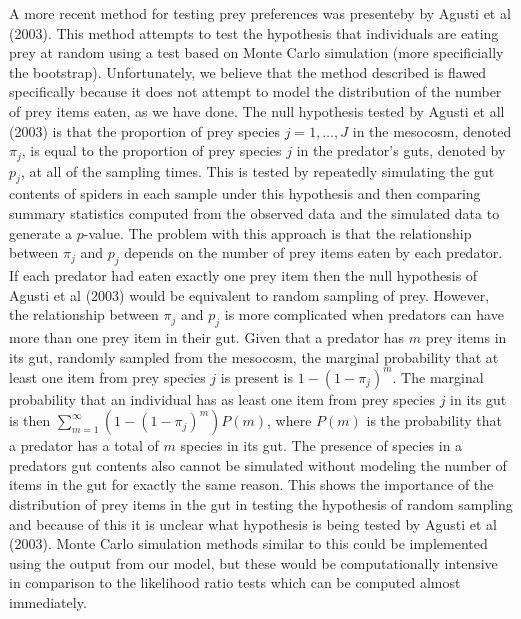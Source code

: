 \documentclass[smallextended]{svjour3}
\begin{document}
A more recent method for testing prey preferences was presenteby by Agusti et al (2003).  This method attempts to test the hypothesis that individuals are eating prey at random using a test based on Monte Carlo simulation (more specificially the bootstrap).  Unfortunately, we believe that the method described is flawed specifically because it does not attempt to model the distribution of the number of prey items eaten, as we have done.  The null hypothesis tested by Agusti et all (2003) is that the proportion of prey species $j=1,\ldots,J$ in the mesocosm, denoted $\pi_j$, is equal to the proportion of prey species $j$ in the predator's guts, denoted by $p_j$, at all of the sampling times.  This is tested by repeatedly simulating the gut contents of spiders in each sample under this hypothesis and then comparing summary statistics computed from the observed data and the simulated data to generate a $p$-value.  The problem with this approach is that the relationship between $\pi_j$ and $p_j$ depends on the number of prey items eaten by each predator.  If each predator had eaten exactly one prey item then the null hypothesis of Agusti et al (2003) would be equivalent to random sampling of prey.  However, the relationship between $\pi_j$ and $p_j$ is more complicated when predators can have more than one prey item in their gut.  Given that a predator has $m$ prey items in its gut, randomly sampled from the mesocosm, the marginal probability that at least one item from prey species $j$ is present is $1-(1-\pi_j)^m$.  The marginal probability that an individual has as least one item from prey species $j$ in its gut is then $\sum_{m=1}^{\infty} (1-(1-\pi_j)^m)P(m)$, where $P(m)$ is the probability that a predator has a total of $m$ species in its gut.  The presence of species in a predators gut contents also cannot be simulated without modeling the number of items in the gut for exactly the same reason.  This shows the importance of the distribution of prey items in the gut in testing the hypothesis of random sampling and because of this it is unclear what hypothesis is being tested by Agusti et al (2003).  Monte Carlo simulation methods similar to this could be implemented using the output from our model, but these would be computationally intensive in comparison to the likelihood ratio tests which can be computed almost immediately.
\end{document}
